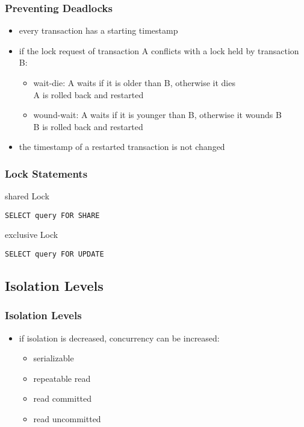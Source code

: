 \documentclass[dvipsnames]{beamer}
\theoremstyle{plain}
\begin{document}
\begin{frame}
  \frametitle{Preventing Deadlocks}

  \begin{itemize}
    \item every transaction has a starting timestamp

    \pause
    \item if the lock request of transaction A conflicts with a lock held by
      transaction B:
    \begin{itemize}
      \item \alert{wait-die}: A waits if it is older than B, otherwise it dies\\
        A is rolled back and restarted

      \item \alert{wound-wait}: A waits if it is younger than B, otherwise it
        wounds B\\
        B is rolled back and restarted
    \end{itemize}

    \pause
    \item the timestamp of a restarted transaction is not changed
  \end{itemize}
\end{frame}

\begin{frame}[fragile]
  \frametitle{Lock Statements}

  \begin{block}{shared Lock}
    \begin{lstlisting}
SELECT query FOR SHARE
    \end{lstlisting}
  \end{block}

  \pause
  \begin{block}{exclusive Lock}
    \begin{lstlisting}
SELECT query FOR UPDATE
    \end{lstlisting}
  \end{block}
\end{frame}

\subsection{Isolation Levels}

\begin{frame}
  \frametitle{Isolation Levels}

  \begin{itemize}
    \item if isolation is decreased, concurrency can be increased:
    \begin{itemize}
      \item serializable
      \item repeatable read
      \item read committed
      \item read uncommitted
    \end{itemize}
  \end{itemize}
\end{frame}
\end{document}

